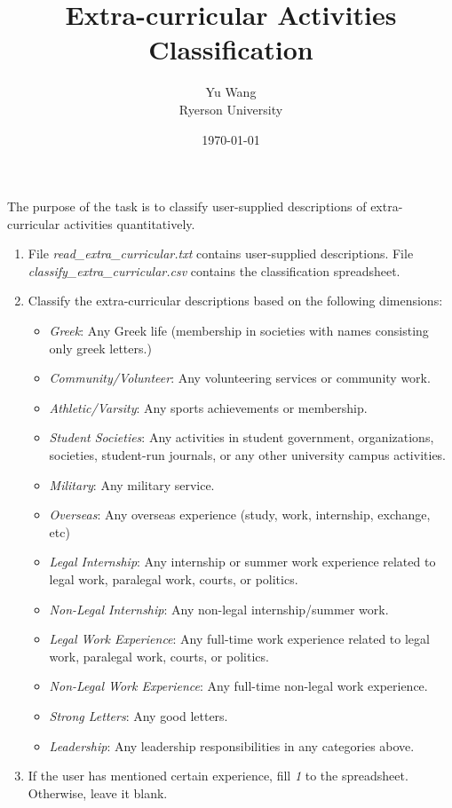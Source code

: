 \documentclass[12pt]{article}
\begin{document}
\title{Extra-curricular Activities Classification} 
  
 \author{Yu Wang\\
 Ryerson University}

\date{\today}
\maketitle

The purpose of the task is to classify user-supplied descriptions of extra-curricular activities quantitatively. 

\begin{enumerate}
\item File {\itshape read\_extra\_curricular.txt} contains user-supplied descriptions. File {\itshape classify\_extra\_curricular.csv} contains the classification spreadsheet.
\item Classify the extra-curricular descriptions based on the following dimensions:
\begin{itemize}
\item {\itshape Greek}: Any Greek life (membership in societies with names consisting only greek letters.)
\item {\itshape Community/Volunteer}: Any volunteering services or community work.
\item {\itshape Athletic/Varsity}: Any sports achievements or membership.
\item {\itshape Student Societies}: Any activities in student government, organizations, societies, student-run journals, or any other university campus activities. 
\item {\itshape Military}: Any military service. 
\item {\itshape Overseas}: Any overseas experience (study, work, internship, exchange, etc)
\item {\itshape Legal Internship}: Any internship or summer work experience related to legal work, paralegal work, courts, or politics.
\item {\itshape Non-Legal Internship}: Any non-legal internship/summer work.
\item {\itshape Legal Work Experience}: Any full-time work experience related to legal work, paralegal work, courts, or politics.
\item {\itshape Non-Legal Work Experience}: Any full-time non-legal work experience.
\item {\itshape Strong Letters}: Any good letters.
\item {\itshape Leadership}: Any leadership responsibilities in any categories above.
\end{itemize}
\item If the user has mentioned certain experience, fill {\itshape 1} to the spreadsheet. Otherwise, leave it blank.
\end{enumerate}
\end{document}
